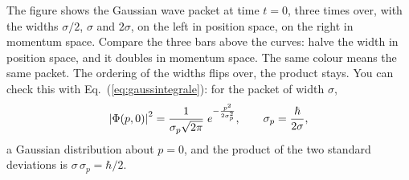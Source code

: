 


The figure shows the Gaussian wave packet at time $t=0$, three times over, with the widths $\sigma/2$, $\sigma$ and $2\sigma$, on the left in position space, on the right in momentum space. Compare the three bars above the curves: halve the width in position space, and it doubles in momentum space. The same colour means the same packet. The ordering of the widths flips over, the product stays. You can check this with Eq.~(\ref{eq:gaussintegrale}): for the packet of width $\sigma$,
\begin{equation}
	\left\lvert \Phi(p,0) \right\rvert^2 = \frac{1}{\sigma_p\sqrt{2\pi}}\;e^{-\frac{p^2}{2\sigma_p^2}}, \qquad \sigma_p = \frac{\hbar}{2\sigma},
\end{equation}
a Gaussian distribution about $p = 0$, and the product of the two standard deviations is $\sigma\,\sigma_p = \hbar/2$.

